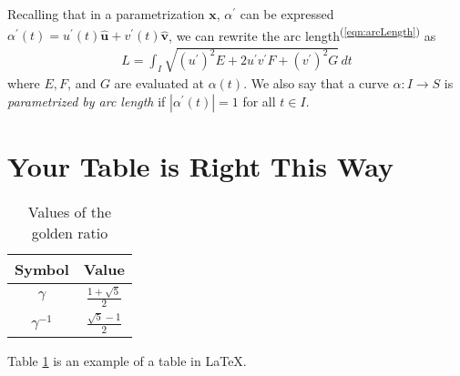 \documentclass[letter]{article}
\newcommand{\X}{\mathbf{x}}
\newcommand{\BV}[1]{\hat{\mathbf{#1}}}
\begin{document}
    Recalling that in a parametrization $\X$, $\alpha^\prime$ can be expressed $\alpha^\prime (t) = u^\prime(t) \BV{u} + v^\prime(t) \BV{v}$, we can rewrite the arc length\textsuperscript{(\ref{eqn:arcLength})} as
\begin{align}
L = \int_I \sqrt{(u^\prime)^2 E + 2 u^\prime v^\prime F + (v^\prime)^2 G} \, dt
\end{align}
where $E, F$, and $G$ are evaluated at $\alpha(t)$. We also say that a curve $\alpha: I \to S$ is \textit{parametrized by arc length} if $|\alpha^\prime (t)| = 1$ for all $t \in I$. \lipsum[2]


\section{Your Table is Right This Way}

\begin{table}[h] 
\centering

\begin{tabular}{ | c c | }
\hline
Symbol & Value \\ [.25em]
\hline \hline
$\gamma$ & $\frac{1 + \sqrt{5}}{2}$ \\ [.25em]
$\gamma^{-1} $ & $\frac{\sqrt{5} - 1}{2}$ \\[.25em]
\hline 
\end{tabular}
\caption{Values of the golden ratio}
\label{tab:gamma}
\end{table}

Table \ref{tab:gamma} is an example of a table in \LaTeX. \lipsum[3]
\end{document}
